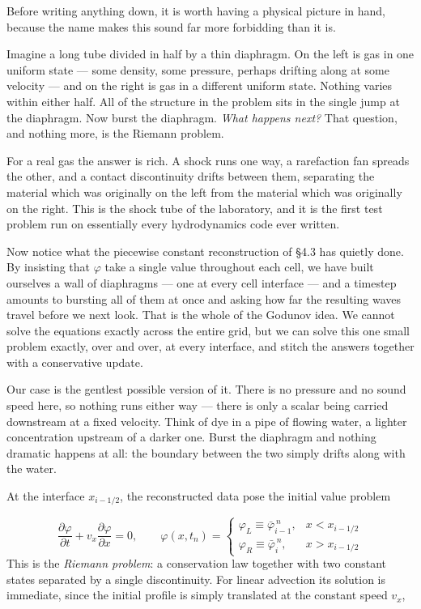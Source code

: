 \documentclass[notoc]{tufte-handout}
\begin{document}
Before writing anything down, it is worth having a physical picture in hand, because the name makes this sound far more forbidding than it is.

Imagine a long tube divided in half by a thin diaphragm. On the left is gas in one uniform state --- some density, some pressure, perhaps drifting along at some velocity --- and on the right is gas in a different uniform state. Nothing varies within either half. All of the structure in the problem sits in the single jump at the diaphragm. Now burst the diaphragm. {\it What happens next?} That question, and nothing more, is the Riemann problem.

For a real gas the answer is rich. A shock runs one way, a rarefaction fan spreads the other, and a contact discontinuity drifts between them, separating the material which was originally on the left from the material which was originally on the right. This is the shock tube of the laboratory, and it is the first test problem run on essentially every hydrodynamics code ever written. 

Now notice what the piecewise constant reconstruction of \S 4.3 has quietly done. By insisting that $\varphi$ take a single value throughout each cell, we have built ourselves a wall of diaphragms --- one at every cell interface --- and a timestep amounts to bursting all of them at once and asking how far the resulting waves travel before we next look. That is the whole of the Godunov idea. We cannot solve the equations exactly across the entire grid, but we can solve this one small problem exactly, over and over, at every interface, and stitch the answers together with a conservative update.

Our case is the gentlest possible version of it. There is no pressure and no sound speed here, so nothing runs either way --- there is only a scalar being carried downstream at a fixed velocity. Think of dye in a pipe of flowing water, a lighter concentration upstream of a darker one. Burst the diaphragm and nothing dramatic happens at all: the boundary between the two simply drifts along with the water.

At the interface $x_{i-1/2}$, the reconstructed data pose the initial value problem

\begin{equation}
\frac{\partial \varphi}{\partial t} + v_x \frac{\partial \varphi}{\partial x} = 0, \qquad
\varphi(x,t_n) = \begin{cases}
\varphi_L \equiv \bar{\varphi}_{i-1}^{\,n}, & x < x_{i-1/2} \\
\varphi_R \equiv \bar{\varphi}_{i}^{\,n}, & x > x_{i-1/2}
\end{cases}
\end{equation}
%
This is the {\it Riemann problem}: a conservation law together with two constant states separated by a single discontinuity. For linear advection its solution is immediate, since the initial profile is simply translated at the constant speed $v_x$,
\end{document}
